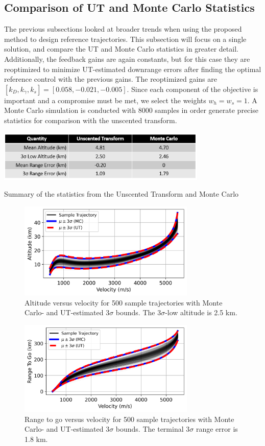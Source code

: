 \documentclass[journal ]{new-aiaa}
\begin{document}
\subsection*{Comparison of UT and Monte Carlo Statistics}
The previous subsections looked at broader trends when using the proposed method to design reference trajectories. This subsection will focus on a single solution, and compare the UT and Monte Carlo statistics in greater detail. Additionally, the feedback gains are again constants, but for this case they are reoptimized to minimize UT-estimated downrange errors after finding the optimal reference control with the previous gains. The reoptimized gains are $[k_D, k_{\gamma}, k_s] = [0.058, -0.021, -0.005]$. Since each component of the objective is important and a compromise must be met, we select the weights $w_h=w_s=1$. A Monte Carlo simulation is conducted with 8000 samples in order generate precise statistics for comparison with the unscented transform. 
\begin{table}[h!]
	\centering
	\includegraphics[width=0.75\textwidth]{ddp/table_mc}
	\caption{Summary of the statistics from the Unscented Transform and Monte Carlo}
	\label{table_mc}
\end{table}
\begin{figure}[h!]
	\centering
	\includegraphics[width=0.75\textwidth]{ddp/python/Altitude}
	\caption{Altitude versus velocity for 500 sample trajectories with Monte Carlo- and UT-estimated 3$\sigma$ bounds. The 3$ \sigma $-low altitude is 2.5 km.}
	\label{fig_mc_alt}
\end{figure}
\begin{figure}[h!]
	\centering
	\includegraphics[width=0.75\textwidth]{ddp/python/Range}
	\caption{Range to go versus velocity for 500 sample trajectories with Monte Carlo- and UT-estimated 3$\sigma$ bounds. The terminal 3$ \sigma $ range error is 1.8 km.}
	\label{fig_mc_range}
\end{figure}
\end{document}
